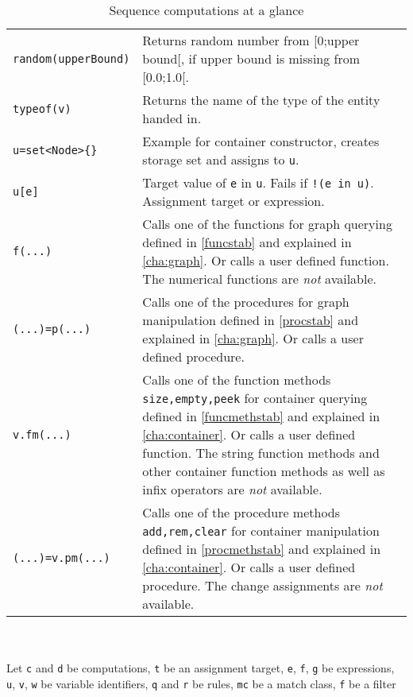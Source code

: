 \begin{table}[htbp]
\begin{minipage}{\linewidth}
\begin{tabularx}{\linewidth}{|lX|}
\texttt{random(upperBound)} & Returns random number from [0;upper bound[, if upper bound is missing from [0.0;1.0[.\\
\texttt{typeof(v)} & Returns the name of the type of the entity handed in.\\
\hline
\texttt{u=set<Node>\{\}} & Example for container constructor, creates storage set and assigns to \texttt{u}.\\
\texttt{u[e]} & Target value of \texttt{e} in \texttt{u}. Fails if \texttt{!(e in u)}. Assignment target or expression.\\
\hline
\texttt{f(...)} & Calls one of the functions for graph querying defined in \ref{funcstab} and explained in \ref{cha:graph}. Or calls a user defined function. The numerical functions are \emph{not} available.\\
\hline
\texttt{(...)=p(...)} & Calls one of the procedures for graph manipulation defined in \ref{procstab} and explained in \ref{cha:graph}. Or calls a user defined procedure.\\
\hline
\texttt{v.fm(...)} & Calls one of the function methods \texttt{size,empty,peek} for container querying defined in \ref{funcmethstab} and explained in \ref{cha:container}. Or calls a user defined function. The string function methods and other container function methods as well as infix operators are \emph{not} available.\\
\hline
\texttt{(...)=v.pm(...)} & Calls one of the procedure methods \texttt{add,rem,clear} for container manipulation defined in \ref{procmethstab} and explained in \ref{cha:container}. Or calls a user defined procedure. The change assignments are \emph{not} available.\\
\hline
\end{tabularx}
\end{minipage}\\
\\ 
{\small Let \texttt{c} and \texttt{d} be computations, \texttt{t} be an assignment target, \texttt{e}, \texttt{f}, \texttt{g} be expressions, \texttt{u}, \texttt{v}, \texttt{w} be variable identifiers, \texttt{q} and \texttt{r} be rules, \texttt{mc} be a match class, \texttt{f} be a filter }
\caption{Sequence computations at a glance}
\label{comptab}
\end{table}
 


